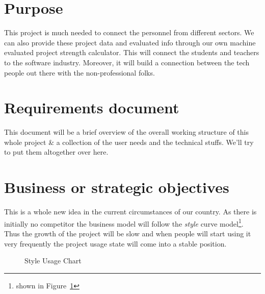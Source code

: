 \documentclass{scrreprt}
\begin{document}
\section{Purpose}
This project is much needed to connect the personnel from different sectors. We can also provide these project data and evaluated info through our own machine evaluated project strength calculator. This will connect the students and teachers to the software industry. Moreover, it will build a connection between the tech people out there with the non-professional folks.

\section{Requirements document}
This document will be a brief overview of the overall working structure of this whole project \& a collection of the user needs and the technical stuffs. We'll try to put them altogether over here.

\section{Business or strategic objectives}
This is a whole new idea in the current circumstances of our country. As there is initially no competitor the business model will follow the \emph{style} curve model\footnote{shown in Figure~\ref{m42}}. Thus the growth of the project will be slow and when people will start using it very frequently the project usage state will come into a stable position.
\begin{figure}
\begin{center}
\end{center}
\caption{Style Usage Chart\label{m42}}

\end{figure}

\end{document}
